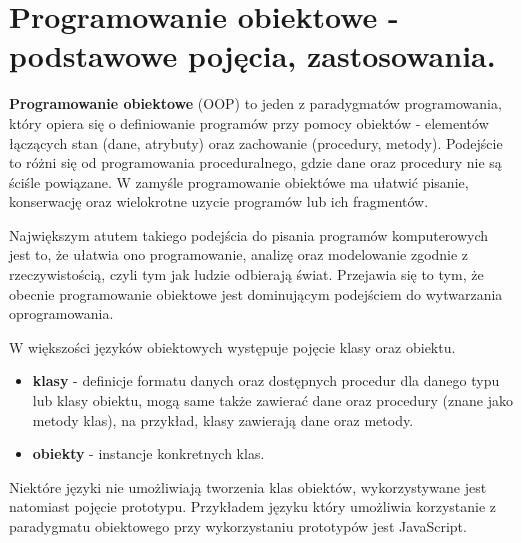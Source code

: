 \documentclass[../main.tex]{subfiles}
\begin{document}
\section{Programowanie obiektowe - podstawowe pojęcia, zastosowania.}

\textbf{Programowanie obiektowe} (OOP) to jeden z paradygmatów programowania, który opiera się o definiowanie programów przy pomocy obiektów - elementów łączących stan (dane, atrybuty) oraz zachowanie (procedury, metody). Podejście to różni się od programowania proceduralnego, gdzie dane oraz procedury nie są ściśle powiązane. W zamyśle programowanie obiektówe ma ułatwić pisanie, konserwację oraz wielokrotne uzycie programów lub ich fragmentów.

Największym atutem takiego podejścia do pisania programów komputerowych jest to, że ułatwia ono programowanie, analizę oraz modelowanie zgodnie z rzeczywistością, czyli tym jak ludzie odbierają świat. Przejawia się to tym, że obecnie programowanie obiektowe jest dominującym podejściem do wytwarzania oprogramowania.

W większości języków obiektowych występuje pojęcie klasy oraz obiektu.
\begin{itemize}
    \item \textbf{klasy} - definicje formatu danych oraz dostępnych procedur dla danego typu lub klasy obiektu, mogą same także zawierać dane oraz procedury (znane jako metody klas), na przykład, klasy zawierają dane oraz metody.
    \item \textbf{obiekty} - instancje konkretnych klas.
\end{itemize}

Niektóre języki nie umożliwiają tworzenia klas obiektów, wykorzystywane jest natomiast pojęcie prototypu. Przykładem języku który umożliwia korzystanie z paradygmatu obiektowego przy wykorzystaniu prototypów jest JavaScript.
\end{document}
